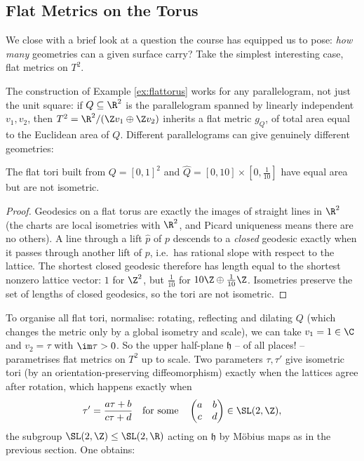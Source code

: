 \subsection{Flat Metrics on the Torus}

We close with a brief look at a question the course has equipped us to pose: \emph{how many} geometries can a given surface carry? Take the simplest interesting case, flat metrics on $T^2$.

The construction of Example \ref{ex:flattorus} works for any parallelogram, not just the unit square: if $Q \subseteq \R^2$ is the parallelogram spanned by linearly independent $v_1, v_2$, then $T^2 = \R^2 / (\Z v_1 \oplus \Z v_2)$ inherits a flat metric $g_Q$, of total area equal to the Euclidean area of $Q$. Different parallelograms can give genuinely different geometries:

\begin{lemma}
    The flat tori built from $Q = [0,1]^2$ and $\hat Q = [0, 10] \times [0, \tfrac{1}{10}]$ have equal area but are not isometric.
\end{lemma}
\begin{proof}
    Geodesics on a flat torus are exactly the images of straight lines in $\R^2$ (the charts are local isometries with $\R^2$, and Picard uniqueness means there are no others). A line through a lift $\hat p$ of $p$ descends to a \emph{closed} geodesic exactly when it passes through another lift of $p$, i.e.\ has rational slope with respect to the lattice. The shortest closed geodesic therefore has length equal to the shortest nonzero lattice vector: $1$ for $\Z^2$, but $\tfrac{1}{10}$ for $10\Z \oplus \tfrac{1}{10}\Z$. Isometries preserve the set of lengths of closed geodesics, so the tori are not isometric.
\end{proof}

To organise all flat tori, normalise: rotating, reflecting and dilating $Q$ (which changes the metric only by a global isometry and scale), we can take $v_1 = 1 \in \C$ and $v_2 = \tau$ with $\im \tau > 0$. So the upper half-plane $\mathfrak{h}$ -- of all places! -- parametrises flat metrics on $T^2$ up to scale. Two parameters $\tau, \tau'$ give isometric tori (by an orientation-preserving diffeomorphism) exactly when the lattices agree after rotation, which happens exactly when
$$
\tau' = \frac{a \tau + b}{c \tau + d} \quad \text{for some} \quad \begin{pmatrix} a & b \\ c & d \end{pmatrix} \in \SL(2, \Z),
$$
the subgroup $\SL(2, \Z) \leq \SL(2, \R)$ acting on $\mathfrak{h}$ by M\"obius maps as in the previous section. One obtains:


